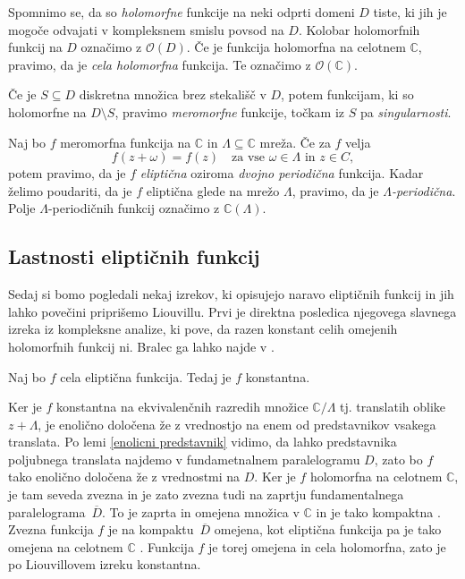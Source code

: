 \documentclass[mat1]{fmfdelo}
\newcommand{\C}{\mathbb C}
\newcommand{\om}{\omega}
\newcommand{\hol}[1]{\mathcal{O}(#1)}
\newcommand{\olsi}[1]{\,\overline{\!{#1}}} %
\theoremstyle{definition}
\begin{document}
Spomnimo se, da so \emph{holomorfne} funkcije na neki odprti domeni $D$ tiste, ki jih je mogoče odvajati v kompleksnem smislu povsod na $D$. Kolobar holomorfnih funkcij na $D$ označimo z $\hol{D}$. Če je funkcija holomorfna na celotnem $\C$, pravimo, da je \emph{cela holomorfna} funkcija. Te označimo z $\hol{\C}$.

Če je $S \subseteq D$ diskretna množica brez stekališč v $D$, potem funkcijam, ki so holomorfne na $D \setminus S$, pravimo \emph{meromorfne} funkcije, točkam iz $S$ pa \emph{singularnosti}. 

\begin{definicija}
    Naj bo $f$ meromorfna funkcija na $\C$ in $\Lambda \subseteq \C$ mreža. Če za $f$ velja
    \[
        f(z + \om) = f(z) \quad \text{za vse $\om \in \Lambda$ in $z \in C$},
    \]
    potem pravimo, da je $f$ \emph{eliptična} oziroma \emph{dvojno periodična} funkcija. Kadar želimo poudariti, da je $f$ eliptična glede na mrežo $\Lambda$, pravimo, da je \emph{$\Lambda$-periodična}. Polje $\Lambda$-periodičnih funkcij označimo z $\C(\Lambda)$. %
\end{definicija}





\subsection{Lastnosti eliptičnih funkcij}

Sedaj si bomo pogledali nekaj izrekov, ki opisujejo naravo eliptičnih funkcij in jih lahko povečini priprišemo Liouvillu. Prvi je direktna posledica njegovega slavnega izreka iz kompleksne analize, ki pove, da razen konstant celih omejenih holomorfnih funkcij ni. Bralec ga lahko najde v \cite[]{}.

\begin{izrek}
    Naj bo $f$ cela eliptična funkcija. Tedaj je $f$ konstantna.
\end{izrek}

\begin{dokaz}
    Ker je $f$ konstantna na ekvivalenčnih razredih množice $\C/\Lambda$ tj. translatih oblike $z + \Lambda$, je enolično določena že z vrednostjo na enem od predstavnikov vsakega translata. Po lemi \ref{enolicni predstavnik} vidimo, da lahko predstavnika poljubnega translata najdemo v fundametnalnem paralelogramu $D$, zato bo $f$ tako enolično določena že z vrednostmi na $D$. Ker je $f$ holomorfna na celotnem $\C$, je tam seveda zvezna in je zato zvezna tudi na zaprtju fundamentalnega paralelograma $\olsi{D}$. To je zaprta in omejena množica v $\C$ in je tako kompaktna \cite[]{}. Zvezna funkcija $f$ je na kompaktu $\olsi{D}$ omejena, kot eliptična funkcija pa je tako omejena na celotnem $\C$ \cite[]{}. Funkcija $f$ je torej omejena in cela holomorfna, zato je po Liouvillovem izreku konstantna.  
\end{dokaz}
\end{document}
